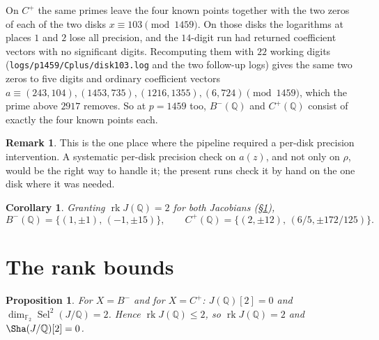 \documentclass[11pt,reqno]{amsart}
\theoremstyle{plain}
\newtheorem{proposition}[theorem]{Proposition}
\newtheorem{corollary}[theorem]{Corollary}
\theoremstyle{definition}
\newtheorem{remark}[theorem]{Remark}
\newcommand{\Q}{\mathbb{Q}}
\newcommand{\FF}{\mathbb{F}}
\DeclareMathOperator{\rk}{rk}
\DeclareMathOperator{\Sel}{Sel}
\numberwithin{equation}{section}
\begin{document}
On $C^{+}$ the same primes leave the four known points together with the two
zeros of each of the two disks $x\equiv103\pmod{1459}$. On those disks the
logarithms at places $1$ and $2$ lose all precision, and the $14$-digit run had
returned coefficient vectors with no significant digits. Recomputing them with
$22$ working digits (\texttt{logs/p1459/Cplus/disk103.log} and the two follow-up
logs) gives the same two zeros to five digits and ordinary coefficient vectors
$a\equiv(243,104),(1453,735),(1216,1355),(6,724)\pmod{1459}$, which the prime
above $2917$ removes. So at $p=1459$ too, $B^{-}(\Q)$ and $C^{+}(\Q)$ consist of
exactly the four known points each.

\begin{remark}
This is the one place where the pipeline required a per-disk precision
intervention. A systematic per-disk precision check on $a(z)$, and not only on
$\rho$, would be the right way to handle it; the present runs check it by hand
on the one disk where it was needed.
\end{remark}

\begin{corollary}\label{cor:hardpair}
Granting $\rk J(\Q)=2$ for both Jacobians (\S\ref{sec:rank}),
\[
  B^{-}(\Q)=\{(1,\pm1),\,(-1,\pm15)\},\qquad
  C^{+}(\Q)=\{(2,\pm12),\,(6/5,\pm172/125)\}.
\]
\end{corollary}

\section{The rank bounds}\label{sec:rank}

\begin{proposition}\label{prop:rank}
For $X=B^{-}$ and for $X=C^{+}$: $J(\Q)[2]=0$ and $\dim_{\FF_{2}}\Sel^{2}(J/\Q)=2$.
Hence $\rk J(\Q)\le2$, so $\rk J(\Q)=2$ and $\Sha(J/\Q)[2]=0$.
\end{proposition}
\end{document}
